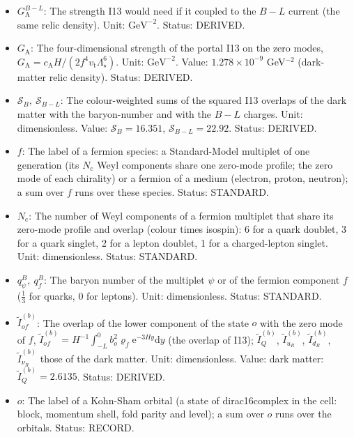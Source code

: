 \documentclass[
  10pt,
]{article}
\providecommand{\tightlist}{%
  \setlength{\itemsep}{0pt}\setlength{\parskip}{0pt}}
\begin{document}
\begin{itemize}
\tightlist
\item
  \(G_{\mathrm{A}}^{B-L}\): The strength I13 would need if it coupled to
  the \(B - L\) current (the same relic density). Unit:
  \(\mathrm{GeV}^{-2}\). Status: DERIVED.
\item
  \(G_{\mathrm{A}}\): The four-dimensional strength of the portal I13 on
  the zero modes,
  \(G_{\mathrm{A}} = c_{\mathrm{A}}H/(2f^4v_{\mathrm{t}}\Lambda_\star^6)\).
  Unit: \(\mathrm{GeV}^{-2}\). Value: \(1.278\times10^{-9}\)
  GeV\(^{-2}\) (dark-matter relic density). Status: DERIVED.
\item
  \(\mathcal{S}_B,\ \mathcal{S}_{B-L}\): The colour-weighted sums of the
  squared I13 overlaps of the dark matter with the baryon-number and
  with the \(B - L\) charges. Unit: dimensionless. Value:
  \(\mathcal{S}_B = 16.351\), \(\mathcal{S}_{B-L} = 22.92\). Status:
  DERIVED.
\item
  \(f\): The label of a fermion species: a Standard-Model multiplet of
  one generation (its \(N_{\mathrm{c}}\) Weyl components share one
  zero-mode profile; the zero mode of each chirality) or a fermion of a
  medium (electron, proton, neutron); a sum over \(f\) runs over these
  species. Status: STANDARD.
\item
  \(N_{\mathrm{c}}\): The number of Weyl components of a fermion
  multiplet that share its zero-mode profile and overlap (colour times
  isospin): 6 for a quark doublet, 3 for a quark singlet, 2 for a lepton
  doublet, 1 for a charged-lepton singlet. Unit: dimensionless. Status:
  STANDARD.
\item
  \(q^B_\psi,\ q^B_f\): The baryon number of the multiplet \(\psi\) or
  of the fermion component \(f\) (\(\frac13\) for quarks, 0 for
  leptons). Unit: dimensionless. Status: STANDARD.
\item
  \(\tilde I^{(b)}_{of}\): The overlap of the lower component of the
  state \(o\) with the zero mode of \(f\),
  \(\tilde I^{(b)}_{of} = H^{-1}\int_{-L}^{0}b_o^2\varrho_f\mathrm{e}^{-3Hy}\mathrm{d}y\)
  (the overlap of I13); \(\tilde I^{(b)}_Q\), \(\tilde I^{(b)}_{u_R}\),
  \(\tilde I^{(b)}_{d_R}\), \(\tilde I^{(b)}_{\nu_R}\) those of the dark
  matter. Unit: dimensionless. Value: dark matter:
  \(\tilde I^{(b)}_Q = 2.6135\). Status: DERIVED.
\item
  \(o\): The label of a Kohn-Sham orbital (a state of dirac16complex in
  the cell: block, momentum shell, fold parity and level); a sum over
  \(o\) runs over the orbitals. Status: RECORD.

\end{itemize}
\end{document}
